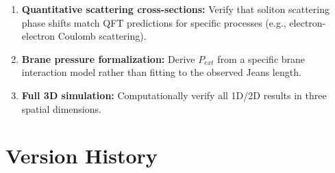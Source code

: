 \documentclass[11pt, a4paper]{article}
\begin{document}
\begin{enumerate}[nosep]
  \item \textbf{Quantitative scattering cross-sections:} Verify that
        soliton scattering phase shifts match QFT predictions for specific
        processes (e.g., electron-electron Coulomb scattering).
  \item \textbf{Brane pressure formalization:} Derive $P_{ext}$ from a
        specific brane interaction model rather than fitting to the observed
        Jeans length.
  \item \textbf{Full 3D simulation:} Computationally verify all 1D/2D
        results in three spatial dimensions.
\end{enumerate}

\section{Version History}
\end{document}
